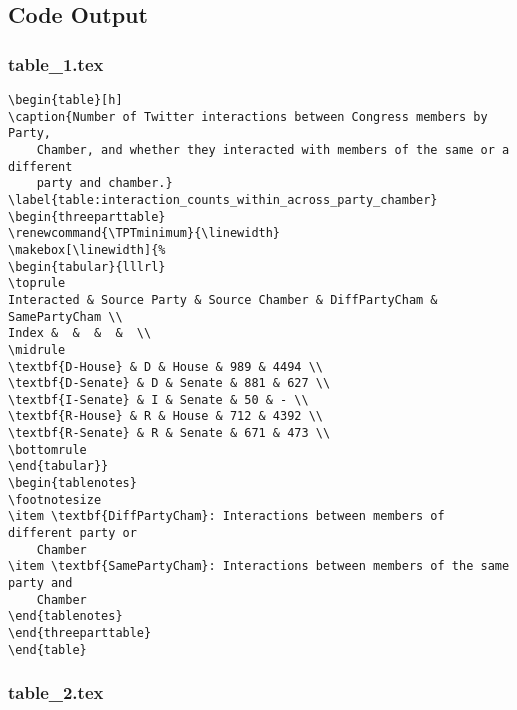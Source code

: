 \documentclass[11pt]{article}
\begin{document}
\subsection{Code Output}

\subsubsection*{table\_1.tex}

\begin{Verbatim}[tabsize=4]
\begin{table}[h]
\caption{Number of Twitter interactions between Congress members by Party,
	Chamber, and whether they interacted with members of the same or a different
	party and chamber.}
\label{table:interaction_counts_within_across_party_chamber}
\begin{threeparttable}
\renewcommand{\TPTminimum}{\linewidth}
\makebox[\linewidth]{%
\begin{tabular}{lllrl}
\toprule
Interacted & Source Party & Source Chamber & DiffPartyCham & SamePartyCham \\
Index &  &  &  &  \\
\midrule
\textbf{D-House} & D & House & 989 & 4494 \\
\textbf{D-Senate} & D & Senate & 881 & 627 \\
\textbf{I-Senate} & I & Senate & 50 & - \\
\textbf{R-House} & R & House & 712 & 4392 \\
\textbf{R-Senate} & R & Senate & 671 & 473 \\
\bottomrule
\end{tabular}}
\begin{tablenotes}
\footnotesize
\item \textbf{DiffPartyCham}: Interactions between members of different party or
	Chamber
\item \textbf{SamePartyCham}: Interactions between members of the same party and
	Chamber
\end{tablenotes}
\end{threeparttable}
\end{table}

\end{Verbatim}

\subsubsection*{table\_2.tex}
\end{document}
